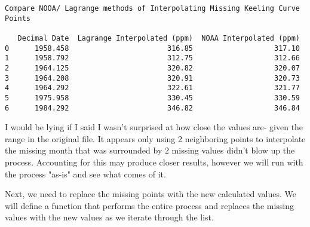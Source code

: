 \documentclass[11pt]{article}
\begin{document}
    \begin{Verbatim}[commandchars=\\\{\}]
Compare NOOA/ Lagrange methods of Interpolating Missing Keeling Curve Points

   Decimal Date  Lagrange Interpolated (ppm)  NOAA Interpolated (ppm)
0      1958.458                       316.85                   317.10
1      1958.792                       312.75                   312.66
2      1964.125                       320.82                   320.07
3      1964.208                       320.91                   320.73
4      1964.292                       322.61                   321.77
5      1975.958                       330.45                   330.59
6      1984.292                       346.82                   346.84

    \end{Verbatim}

    I would be lying if I said I wasn't surprised at how close the values
are- given the range in the original file. It appears only using 2
neighboring points to interpolate the missing month that was surrounded
by 2 missing values didn't blow up the process. Accounting for this may
produce closer results, however we will run with the process "as-is" and
see what comes of it.

Next, we need to replace the missing points with the new calculated
values. We will define a function that performs the entire process and
replaces the missing values with the new values as we iterate through
the list.
\end{document}
